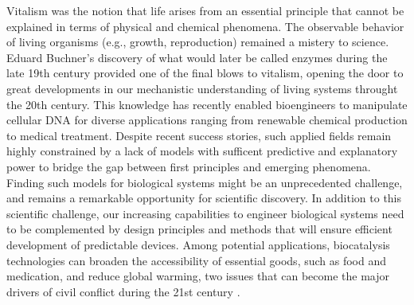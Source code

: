 Vitalism was the notion that life arises from an essential principle that cannot be explained in terms of physical and chemical phenomena.
The observable behavior of living organisms (e.g., growth, reproduction) remained a mistery to science.
Eduard Buchner's discovery of what would later be called enzymes during the late 19th century provided one of the final blows to vitalism, opening the door to
great developments in our mechanistic understanding of living systems throught the 20th century.
This knowledge has recently enabled bioengineers to manipulate cellular DNA for diverse applications ranging from renewable chemical production to medical treatment. Despite recent success stories, such applied fields remain highly constrained by a lack of models with sufficent predictive and explanatory power to bridge the gap between first principles and emerging phenomena.
Finding such models for biological systems might be an unprecedented challenge, and remains a remarkable opportunity for scientific discovery.
In addition to this scientific challenge, our increasing capabilities to engineer biological systems need to be complemented by design principles and methods that will ensure efficient development of predictable devices. %
Among potential applications, biocatalysis technologies can broaden the accessibility of essential goods, such as food and medication, and reduce global warming, two issues that can become the major drivers of civil conflict during the 21st century \citep{barnett2007, hsiang2011, dod2015}. %

